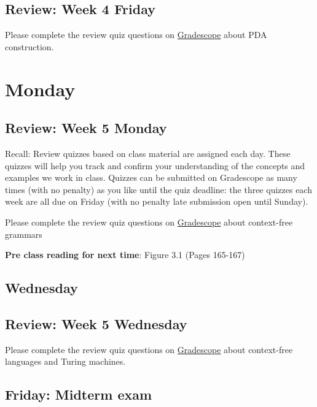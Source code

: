 

\newpage
\subsection*{Review: Week 4 Friday}


Please complete the review quiz questions on \href{http://gradescope.com}{Gradescope} about 
PDA construction.


\newpage

\section*{Monday}


    
\newpage
\subsection*{Review: Week 5 Monday}


Recall: Review quizzes based on class material are assigned each day. 
These quizzes will help you track and confirm your understanding of the concepts and examples 
we work in class. Quizzes can be submitted on Gradescope as many times (with no penalty) as 
you like until the quiz deadline: the three quizzes each week are all due on Friday (with no penalty 
late submission open until Sunday).

Please complete the review quiz questions on \href{http://gradescope.com}{Gradescope} about 
context-free grammars

{\bf Pre class reading for next time}: Figure 3.1 (Pages 165-167)

\newpage
\subsection*{Wednesday}




\newpage
\subsection*{Review: Week 5 Wednesday}

Please complete the review quiz questions on \href{http://gradescope.com}{Gradescope} about 
context-free languages and Turing machines.


\newpage
\subsection*{Friday: Midterm exam}

